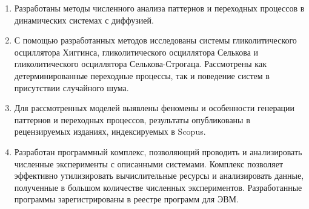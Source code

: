 \begin{enumerate}
  \item Разработаны методы численного анализа паттернов и переходных процессов в динамических системах с диффузией. 
  \item С помощью разработанных методов исследованы системы гликолитического осциллятора Хиггинса, гликолитического осциллятора Селькова и гликолитического осциллятора Селькова-Строгаца. Рассмотрены как детерминированные переходные процессы, так и поведение систем в присутствии случайного шума.
  \item Для рассмотренных моделей выявлены феномены и особенности генерации паттернов и переходных процессов, результаты опубликованы в рецензируемых изданиях, индексируемых в Scopus.
  \item Разработан программный комплекс, позволяющий проводить и анализировать численные эксперименты с описанными системами. Комплекс позволяет эффективно утилизировать вычислительные ресурсы и анализировать данные, полученные в большом количестве численных экспериментов. Разработанные программы зарегистрированы в реестре программ для ЭВМ.
\end{enumerate}
